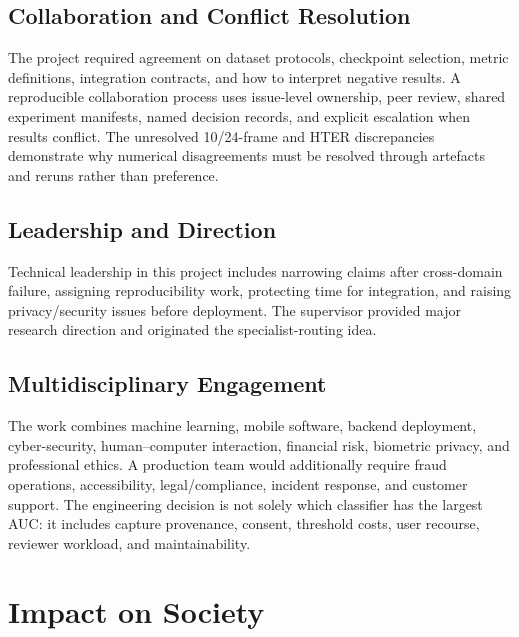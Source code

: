 \subsection{Collaboration and Conflict Resolution}

The project required agreement on dataset protocols, checkpoint selection,
metric definitions, integration contracts, and how to interpret negative results.
A reproducible collaboration process uses issue-level ownership, peer review,
shared experiment manifests, named decision records, and explicit escalation when
results conflict. The unresolved 10/24-frame and HTER discrepancies demonstrate
why numerical disagreements must be resolved through artefacts and reruns rather
than preference. 

\subsection{Leadership and Direction}

Technical leadership in this project includes narrowing claims after cross-domain
failure, assigning reproducibility work, protecting time for integration, and
raising privacy/security issues before deployment. The supervisor provided major
research direction and originated the specialist-routing idea. 

\subsection{Multidisciplinary Engagement}

The work combines machine learning, mobile software, backend deployment,
cyber-security, human--computer interaction, financial risk, biometric privacy,
and professional ethics. A production team would additionally require fraud
operations, accessibility, legal/compliance, incident response, and customer
support. The engineering decision is not solely which classifier has the largest
AUC: it includes capture provenance, consent, threshold costs, user recourse,
reviewer workload, and maintainability.

\section{Impact on Society}

